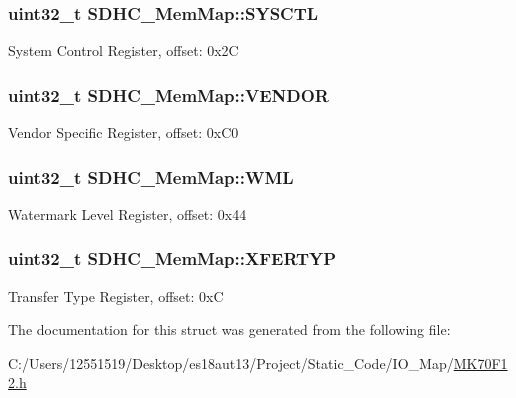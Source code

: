 \subsubsection[{S\+Y\+S\+C\+T\+L}]{\setlength{\rightskip}{0pt plus 5cm}uint32\+\_\+t S\+D\+H\+C\+\_\+\+Mem\+Map\+::\+S\+Y\+S\+C\+T\+L}\label{struct_s_d_h_c___mem_map_ae3204e728de4488f0b3569d1ebac78ae}
System Control Register, offset\+: 0x2\+C \hypertarget{struct_s_d_h_c___mem_map_ac3938ee338b7499c8b1cebed71604299}{}
\subsubsection[{V\+E\+N\+D\+O\+R}]{\setlength{\rightskip}{0pt plus 5cm}uint32\+\_\+t S\+D\+H\+C\+\_\+\+Mem\+Map\+::\+V\+E\+N\+D\+O\+R}\label{struct_s_d_h_c___mem_map_ac3938ee338b7499c8b1cebed71604299}
Vendor Specific Register, offset\+: 0x\+C0 \hypertarget{struct_s_d_h_c___mem_map_a8c1eb45065f5eb8878fc02701f2a6750}{}
\subsubsection[{W\+M\+L}]{\setlength{\rightskip}{0pt plus 5cm}uint32\+\_\+t S\+D\+H\+C\+\_\+\+Mem\+Map\+::\+W\+M\+L}\label{struct_s_d_h_c___mem_map_a8c1eb45065f5eb8878fc02701f2a6750}
Watermark Level Register, offset\+: 0x44 \hypertarget{struct_s_d_h_c___mem_map_ad6c008e044af83f7411e51258f111c48}{}
\subsubsection[{X\+F\+E\+R\+T\+Y\+P}]{\setlength{\rightskip}{0pt plus 5cm}uint32\+\_\+t S\+D\+H\+C\+\_\+\+Mem\+Map\+::\+X\+F\+E\+R\+T\+Y\+P}\label{struct_s_d_h_c___mem_map_ad6c008e044af83f7411e51258f111c48}
Transfer Type Register, offset\+: 0x\+C 

The documentation for this struct was generated from the following file\+:\begin{DoxyCompactItemize}
\item 
C\+:/\+Users/12551519/\+Desktop/es18aut13/\+Project/\+Static\+\_\+\+Code/\+I\+O\+\_\+\+Map/\hyperlink{_m_k70_f12_8h}{M\+K70\+F12.\+h}\end{DoxyCompactItemize}
